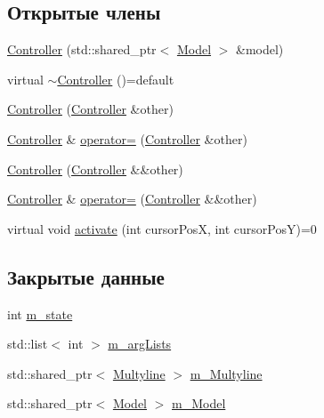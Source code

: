 \subsection*{Открытые члены}
\begin{DoxyCompactItemize}
\item 
\hyperlink{class_controller_ad2ce690a1bfa8ec80e9785ee8b475592}{Controller} (std\-::shared\-\_\-ptr$<$ \hyperlink{class_model}{Model} $>$ \&model)
\item 
virtual \hyperlink{class_controller_a8d16a7a97c266dc0d5aa5685c4dcdd89}{$\sim$\-Controller} ()=default
\item 
\hyperlink{class_controller_abae5d6be388bd2499f1ffb01a4c60f2d}{Controller} (\hyperlink{class_controller}{Controller} \&other)
\item 
\hyperlink{class_controller}{Controller} \& \hyperlink{class_controller_a74985f0bdefdb90a5d31e195684aac97}{operator=} (\hyperlink{class_controller}{Controller} \&other)
\item 
\hyperlink{class_controller_a8b96e5f809484c765067f551e948b32a}{Controller} (\hyperlink{class_controller}{Controller} \&\&other)
\item 
\hyperlink{class_controller}{Controller} \& \hyperlink{class_controller_a9b263660c90a6d2f7e65ccadaa46fd2d}{operator=} (\hyperlink{class_controller}{Controller} \&\&other)
\item 
virtual void \hyperlink{class_controller_a4cc69a630011f49efb0c221d617af633}{activate} (int cursor\-Pos\-X, int cursor\-Pos\-Y)=0
\end{DoxyCompactItemize}
\subsection*{Закрытые данные}
\begin{DoxyCompactItemize}
\item 
int \hyperlink{class_controller_a8b090b5fb29c22eb74d6bab24713ce4e}{m\-\_\-state}
\item 
std\-::list$<$ int $>$ \hyperlink{class_controller_acaa49bf804d980462e65b7c9df8228ad}{m\-\_\-arg\-Lists}
\item 
std\-::shared\-\_\-ptr$<$ \hyperlink{class_multyline}{Multyline} $>$ \hyperlink{class_controller_a58633f078953ff4035c7fd1fc14ba01c}{m\-\_\-\-Multyline}
\item 
std\-::shared\-\_\-ptr$<$ \hyperlink{class_model}{Model} $>$ \hyperlink{class_controller_a5190c0bded8b780fed2baaf56737b9cb}{m\-\_\-\-Model}
\end{DoxyCompactItemize}


